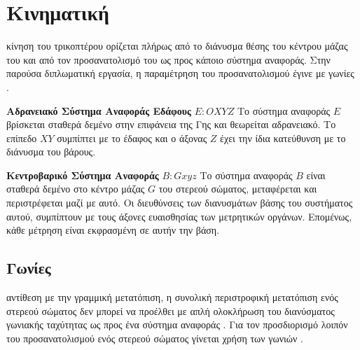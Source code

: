 \section{Κινηματική}
 κίνηση του τρικοπτέρου ορίζεται πλήρως από το διάνυσμα θέσης του 
κέντρου μάζας του και από τον προσανατολισμό του ως προς κάποιο σύστημα 
αναφοράς. Στην παρούσα διπλωματική εργασία, η παραμέτρηση του προσανατολισμού 
έγινε με γωνίες .

\textbf{Αδρανειακό Σύστημα Αναφοράς Εδάφους} \(E : OXYZ\) \qquad Το σύστημα 
αναφοράς \(E\) βρίσκεται σταθερά δεμένο στην επιφάνεια της Γης και θεωρείται 
αδρανειακό. Το επίπεδο \(XY\) συμπίπτει με το έδαφος και ο άξονας \(Z\) έχει την
ίδια κατεύθυνση με το διάνυσμα του βάρους.

\textbf{Κεντροβαρικό Σύστημα Αναφοράς} \(B : Gxyz\) \qquad Το σύστημα αναφοράς 
\(B\) είναι σταθερά δεμένο στο κέντρο μάζας \(G\) του στερεού σώματος,  
μεταφέρεται και περιστρέφεται μαζί με αυτό. Οι διευθύνσεις των διανυσμάτων βάσης
του συστήματος αυτού, συμπίπτουν με τους άξονες ευαισθησίας των μετρητικών 
οργάνων. Επομένως, κάθε μέτρηση είναι εκφρασμένη σε αυτήν την βάση.

\subsection{Γωνίες }

 αντίθεση με την γραμμική μετατόπιση, η συνολική περιστροφική 
μετατόπιση ενός στερεού σώματος δεν μπορεί να προέλθει με απλή ολοκλήρωση του 
διανύσματος γωνιακής ταχύτητας ως προς ένα σύστημα αναφοράς \cite{natsiavas}. 
Για τον προσδιορισμό λοιπόν του προσανατολισμού ενός στερεού σώματος γίνεται 
χρήση των γωνιών . 

